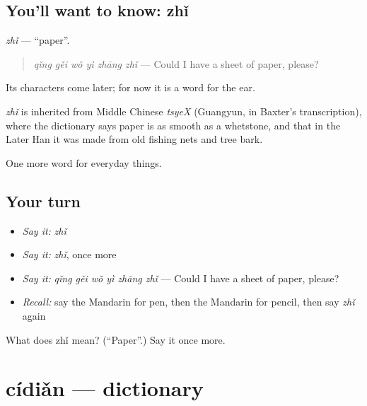 \subsection*{You'll want to know: zhǐ}
\emph{zhǐ} — \textquotedblleft{}paper\textquotedblright{}.

\begin{quote}
\emph{qǐng gěi wǒ yì zhāng zhǐ} — Could I have a sheet of paper, please?
\end{quote}

Its characters come later; for now it is a word for the ear.

\begin{cousinweb}
\emph{zhǐ} is inherited from Middle Chinese \emph{tsyeX} (Guangyun, in Baxter's transcription), where the dictionary says paper is as smooth as a whetstone, and that in the Later Han it was made from old fishing nets and tree bark.
\end{cousinweb}

\begin{grammarlens}[title={What you've built}]
One more word for everyday things.
\end{grammarlens}

\subsection*{Your turn}
\begin{itemize}
\raggedright
  \item \emph{Say it:} \emph{zhǐ}
  \item \emph{Say it:} \emph{zhǐ}, once more
  \item \emph{Say it:} \emph{qǐng gěi wǒ yì zhāng zhǐ} — Could I have a sheet of paper, please?
  \item \emph{Recall:} say the Mandarin for pen, then the Mandarin for pencil, then say \emph{zhǐ} again
\end{itemize}

\begin{tcolorbox}[breakable,colback=teal!4,colframe=teal!35!black,title={Before you move on}]
What does zhǐ mean? (\textquotedblleft{}Paper\textquotedblright{}.) Say it once more.
\end{tcolorbox}
\section[cídiǎn]{cídiǎn — dictionary}

\label{lesson:ZH-C104-cidian}



